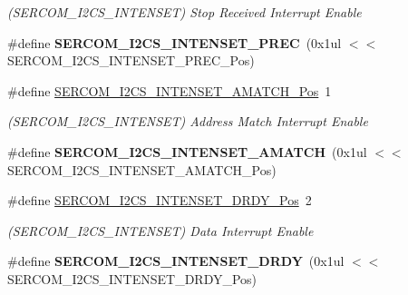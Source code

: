 \begin{DoxyCompactItemize}
\begin{DoxyCompactList}\small\item\em (S\+E\+R\+C\+O\+M\+\_\+\+I2\+C\+S\+\_\+\+I\+N\+T\+E\+N\+S\+E\+T) Stop Received Interrupt Enable \end{DoxyCompactList}\item 
\hypertarget{group___s_a_m_l21___s_e_r_c_o_m_ga41875c34c3c45cf373a7eeba3a1c5636}{}\#define {\bfseries S\+E\+R\+C\+O\+M\+\_\+\+I2\+C\+S\+\_\+\+I\+N\+T\+E\+N\+S\+E\+T\+\_\+\+P\+R\+E\+C}~(0x1ul $<$$<$ S\+E\+R\+C\+O\+M\+\_\+\+I2\+C\+S\+\_\+\+I\+N\+T\+E\+N\+S\+E\+T\+\_\+\+P\+R\+E\+C\+\_\+\+Pos)\label{group___s_a_m_l21___s_e_r_c_o_m_ga41875c34c3c45cf373a7eeba3a1c5636}

\item 
\hypertarget{group___s_a_m_l21___s_e_r_c_o_m_ga13a3936b255bf05530eaabc3b04690d8}{}\#define \hyperlink{group___s_a_m_l21___s_e_r_c_o_m_ga13a3936b255bf05530eaabc3b04690d8}{S\+E\+R\+C\+O\+M\+\_\+\+I2\+C\+S\+\_\+\+I\+N\+T\+E\+N\+S\+E\+T\+\_\+\+A\+M\+A\+T\+C\+H\+\_\+\+Pos}~1\label{group___s_a_m_l21___s_e_r_c_o_m_ga13a3936b255bf05530eaabc3b04690d8}

\begin{DoxyCompactList}\small\item\em (S\+E\+R\+C\+O\+M\+\_\+\+I2\+C\+S\+\_\+\+I\+N\+T\+E\+N\+S\+E\+T) Address Match Interrupt Enable \end{DoxyCompactList}\item 
\hypertarget{group___s_a_m_l21___s_e_r_c_o_m_ga94365736aa1770839278353390dd7abe}{}\#define {\bfseries S\+E\+R\+C\+O\+M\+\_\+\+I2\+C\+S\+\_\+\+I\+N\+T\+E\+N\+S\+E\+T\+\_\+\+A\+M\+A\+T\+C\+H}~(0x1ul $<$$<$ S\+E\+R\+C\+O\+M\+\_\+\+I2\+C\+S\+\_\+\+I\+N\+T\+E\+N\+S\+E\+T\+\_\+\+A\+M\+A\+T\+C\+H\+\_\+\+Pos)\label{group___s_a_m_l21___s_e_r_c_o_m_ga94365736aa1770839278353390dd7abe}

\item 
\hypertarget{group___s_a_m_l21___s_e_r_c_o_m_gadebfef189d2d0ad234e8f2fd38285ee8}{}\#define \hyperlink{group___s_a_m_l21___s_e_r_c_o_m_gadebfef189d2d0ad234e8f2fd38285ee8}{S\+E\+R\+C\+O\+M\+\_\+\+I2\+C\+S\+\_\+\+I\+N\+T\+E\+N\+S\+E\+T\+\_\+\+D\+R\+D\+Y\+\_\+\+Pos}~2\label{group___s_a_m_l21___s_e_r_c_o_m_gadebfef189d2d0ad234e8f2fd38285ee8}

\begin{DoxyCompactList}\small\item\em (S\+E\+R\+C\+O\+M\+\_\+\+I2\+C\+S\+\_\+\+I\+N\+T\+E\+N\+S\+E\+T) Data Interrupt Enable \end{DoxyCompactList}\item 
\hypertarget{group___s_a_m_l21___s_e_r_c_o_m_ga3a97f9f5c56fea12a5eed83eba3917f5}{}\#define {\bfseries S\+E\+R\+C\+O\+M\+\_\+\+I2\+C\+S\+\_\+\+I\+N\+T\+E\+N\+S\+E\+T\+\_\+\+D\+R\+D\+Y}~(0x1ul $<$$<$ S\+E\+R\+C\+O\+M\+\_\+\+I2\+C\+S\+\_\+\+I\+N\+T\+E\+N\+S\+E\+T\+\_\+\+D\+R\+D\+Y\+\_\+\+Pos)\label{group___s_a_m_l21___s_e_r_c_o_m_ga3a97f9f5c56fea12a5eed83eba3917f5}


\end{DoxyCompactItemize}
